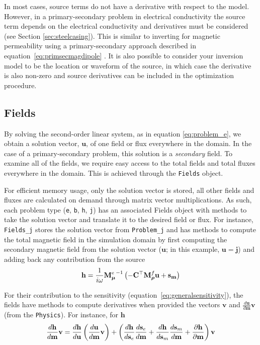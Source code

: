In most cases, source terms do not have a derivative with respect to the model.
However, in a primary-secondary problem in electrical conductivity the source
term depends on the electrical conductivity and derivatives must be considered
(see Section \ref{sec:steelcasing}). This is similar to inverting for
magnetic permeability using a primary-secondary approach described in
equation~\ref{eq:primsecmagdipole} \citep{Coggon1971, Haber2014a, Heagy2015}. It is also
possible to consider your inversion model to be the location or waveform of the source,
in which case the derivative is also non-zero and source derivatives can be
included in the optimization procedure.



\subsection{Fields}
\label{sec:Fields}

By solving the second-order linear system, as in equation \ref{eq:problem_e},
we obtain a solution vector, $\mathbf{u}$, of one field or flux everywhere in the
domain. In the case of a primary-secondary problem, this solution is a
\emph{secondary} field. To examine all of the fields, we require easy
access to the total fields and total fluxes everywhere in the domain.
This is achieved through the \texttt{Fields} object.

For efficient memory usage, only the solution vector is stored, all other
fields and fluxes are calculated on demand through matrix vector
multiplications. As such, each problem type
(\texttt{e}, \texttt{b}, \texttt{h}, \texttt{j}) has an associated Fields object
with methods to take the solution vector and translate it to the desired field
or flux. For instance, \texttt{Fields\_j} stores the solution vector from
\texttt{Problem\_j} and has methods to compute the total magnetic field in the
simulation domain by first computing the secondary magnetic field
from the solution vector ($\mathbf{u}$; in this example, $\mathbf{u} = \mathbf{j}$) and adding back any
contribution from the source
\begin{equation}
    \mathbf{h} = \frac{1}{i\omega} {{\mathbf M}^e_{\boldsymbol{\mu}}}^{-1} \left(-\mathbf{C}^{\top} {{\mathbf M}^f_{\boldsymbol{\rho}}} \mathbf{u} + \mathbf{s_m} \right)
\label{eq:h_from_j}
\end{equation}

For their contribution to the sensitivity
(equation~\ref{eq:generalsensitivity}), the fields have methods to compute
derivatives when provided the vectors $\mathbf{v}$ and
$\frac{d\mathbf{u}}{d\mathbf{m}} \mathbf{v}$ (from the \texttt{Physics}). For instance,
for $\mathbf{h}$
\begin{equation}
 \frac{d\mathbf{h}}{d\mathbf{m}} \mathbf{v} =
 \frac{d\mathbf{h}}{d\mathbf{u}} \left(\frac{d\mathbf{u}}{d\mathbf{m}} \mathbf{v} \right)
        + \left(\frac{d\mathbf{h}}{d\mathbf{s}_e} \frac{d\mathbf{s}_e}{d\mathbf{m}}
        + \frac{d\mathbf{h}}{d\mathbf{s}_m} \frac{d\mathbf{s}_m}{d\mathbf{m}}
        + \frac{\partial\mathbf{h}}{\partial\mathbf{m}} \right)\mathbf{v}
\label{eq:dhdm}
\end{equation}

